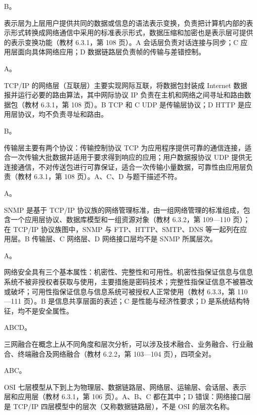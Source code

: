 \documentclass[a4paper,11pt]{article}
\begin{document}
\q B。\begin{analysis}表示层为上层用户提供共同的数据或信息的语法表示变换，负责把计算机内部的表示形式转换成网络通信中采用的标准表示形式，数据压缩和加密也是表示层可提供的表示变换功能（教材 6.3.1，第 108 页）。A 会话层负责对话连接与同步；C 应用层面向具体网络应用；D 数据链路层负责帧的传输与差错控制。\end{analysis}

\q A。\begin{analysis}TCP/IP 的网络层（互联层）主要实现网际互联，将数据包封装成 Internet 数据报并运行必要的路由算法，其中网际协议 IP 负责在主机和网络之间寻址和路由数据包（教材 6.3.1，第 108 页）。B TCP 和 C UDP 是传输层协议；D HTTP 是应用层协议，均不负责寻址和路由。\end{analysis}

\q B。\begin{analysis}传输层主要有两个协议：传输控制协议 TCP 为应用程序提供可靠的通信连接，适合一次传输大批数据并适用于要求得到响应的应用；用户数据报协议 UDP 提供无连接通信，不对传送包进行可靠保证，适合一次传输小量数据，可靠性由应用层负责（教材 6.3.1，第 108 页）。A、C、D 与题干描述不符。\end{analysis}

\q A。\begin{analysis}SNMP 是基于 TCP/IP 协议族的网络管理标准，由一组网络管理的标准组成，包含一个应用层协议、数据库模型和一组资源对象（教材 6.3.2，第 109—110 页）；在 TCP/IP 协议族图中，SNMP 与 FTP、HTTP、SMTP、DNS 等一起列在应用层。B 传输层、C 网络层、D 网络接口层均不是 SNMP 所属层次。\end{analysis}

\q A。\begin{analysis}网络安全具有三个基本属性：机密性、完整性和可用性。机密性指保证信息与信息系统不被非授权者获取与使用，主要措施是密码技术；完整性指保证信息不被篡改或破坏；可用性指保证信息与信息系统可被授权人正常使用（教材 6.3.3，第 110—111 页）。B 是信息共享层面的表述；C 是性能与经济性要求；D 是系统结构特征，均不是安全属性。\end{analysis}


\q ABCD。\begin{analysis}三网融合在概念上从不同角度和层次分析，可以涉及技术融合、业务融合、行业融合、终端融合及网络融合（教材 6.2.2，第 103—104 页），四项全对。\end{analysis}

\q ABC。\begin{analysis}OSI 七层模型从下到上为物理层、数据链路层、网络层、运输层、会话层、表示层和应用层（教材 6.3.1，第 106 页）。A、B、C 都在其中；D 错误：网络接口层是 TCP/IP 四层模型中的层次（又称数据链路层），不是 OSI 的层次名称。\end{analysis}
\end{document}
